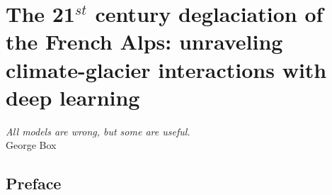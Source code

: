 \chapter{The 21$^{st}$ century deglaciation of the French Alps: unraveling climate-glacier interactions with deep learning}
\label{chap:future}

\begin{flushright}
{\small \textit{All models are wrong, but some are useful.}\\
George Box}
\end{flushright}

\section*{Preface}



